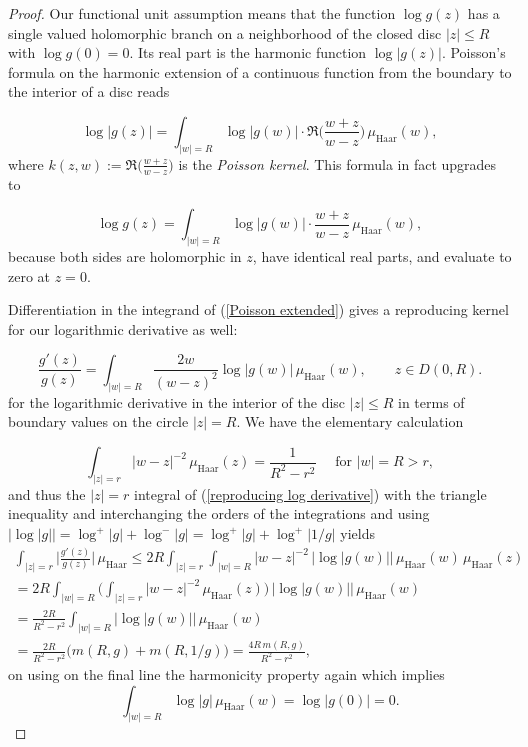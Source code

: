 \documentclass[10pt]{amsart}
\theoremstyle{remark}
\numberwithin{equation}{subsection}
\def\numequation{\addtocounter{subsubsection}{1}\begin{equation}}
\begin{document}
\begin{proof}
Our functional unit assumption means that the function  $\log{g(z)}$ has a single valued holomorphic branch on a neighborhood of the closed disc $|z| \leq R$ with
$\log{g(0)}  = 0$. Its real part is the harmonic function $\log{|g(z)|}$. Poisson's formula 
on the harmonic extension of a continuous function from the boundary to the interior of a disc reads
\numequation \label{Poisson}
\log{|g(z)|} = \int_{|w| = R} \log{|g(w)|} \cdot \mathfrak{R} \Big( \frac{w+z}{w-z} \Big) \,  \mu_{\mathrm{Haar}}(w),
\end{equation}
where $k(z,w) := \mathfrak{R} \Big( \frac{w+z}{w-z} \Big)$ is the {\it Poisson kernel}.  This formula in fact upgrades to
\numequation \label{Poisson extended}
\log{g(z)} = \int_{|w| = R} \log{|g(w)|} \cdot \frac{w+z}{w-z} \,  \mu_{\mathrm{Haar}}(w),
\end{equation}
because both sides are holomorphic in $z$, have identical real parts, and evaluate to zero at $z = 0$.

  
Differentiation in the integrand of (\ref{Poisson extended})  gives
a reproducing kernel for our logarithmic derivative as well: 
\numequation \label{reproducing log derivative}
\frac{g'(z)}{g(z)} = \int_{|w| = R} \frac{2w}{ ( w - z )^2 } \log{|g(w)|} \,\mu_{\mathrm{Haar}}(w), \qquad  z \in D(0,R).
\end{equation}
for the logarithmic derivative in the interior of the disc $|z| \leq R$ in terms of boundary values on the circle $|z| = R$.
We have the elementary calculation
\numequation \label{kernel calc}
\int_{|z| = r} |w-z|^{-2} \, \mu_{\mathrm{Haar}}(z) = \frac{1}{R^2-r^2} \quad \textrm{ for } |w| = R > r,
\end{equation}
and thus the $|z| = r$ integral of (\ref{reproducing log derivative}) with the triangle inequality and interchanging the orders
of the integrations and using $|\log{|g|}| = \log^+{|g|} + \log^-{|g|} = \log^+{|g|} + \log^+{|1/g|}$ yields
\begin{equation*}
\begin{split}
\int_{|z| = r} \Big| \frac{g'(z)}{g(z)} \Big| \, \mu_{\mathrm{Haar}}  
\leq 2R  \int_{|z| = r} \int_{|w| = R} |w-z|^{-2} \, \big| \log{|g(w)|} \big| \,\mu_{\mathrm{Haar}}(w) \,  \mu_{\mathrm{Haar}}(z)
\\ 
= 2R \int_{|w| = R} \Big( \int_{|z| = r} |w-z|^{-2} \, \mu_{\mathrm{Haar}}(z) \Big) \, \big| \log{|g(w)|} \big| \,\mu_{\mathrm{Haar}}(w)
\\
=\frac{2R}{R^2-r^2}   \int_{|w| = R}  \big| \log{|g(w)|} \big| \,\mu_{\mathrm{Haar}}(w)
\\
= \frac{2R}{R^2-r^2} \Big( m(R, g) + m(R,1/g) \Big) = \frac{4R \, m(R,g)}{R^2  -r^2}, 
\end{split}
\end{equation*}
on using on the final line the harmonicity property again which implies
$$
\int_{|w| = R} \log{|g|} \, \mu_{\mathrm{Haar}}(w) = \log{|g(0)|} = 0.
$$


\end{proof}
\end{document}
